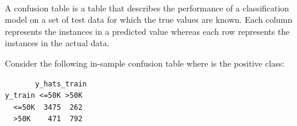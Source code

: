 \documentclass[12pt]{article}
\begin{document}
\begin{enumerate}

 \\ 
A confusion table is a table that describes the performance of a classification model on a set of test data for which the true values are known. Each column represents the instances in a predicted value whereas each row represents the instances in the actual data. 

\newpage
Consider the following in-sample confusion table where  is the positive class:

\begin{Verbatim}
       y_hats_train
y_train <=50K >50K
  <=50K  3475  262
  >50K    471  792
\end{Verbatim}


\end{enumerate}
\end{document}
